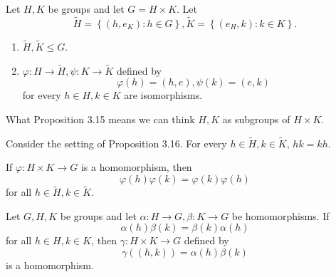 \documentclass[pmath347]{subfiles}
\begin{document}
    \begin{prop}{}
        Let $H,K$ be groups and let $G = H\times K$. Let
        \begin{equation*}
            \tilde{H} = \left\lbrace \left( h,e_K \right) : h\in G \right\rbrace , \tilde{K} = \left\lbrace \left( e_H,k \right) :k\in K \right\rbrace . 
        \end{equation*}
        \begin{enumerate}
            \item $\tilde{H} , \tilde{K} \leq G$.
            \item $\varphi:H\to\tilde{H}, \psi:K\to\tilde{K} $ defined by
                \begin{equation*}
                    \varphi\left( h \right) = \left( h,e \right) , \psi\left( k \right) = \left( e,k \right) 
                \end{equation*}
                for every $h\in H, k\in K$ are isomorphisms.
        \end{enumerate}
    \end{prop}

    \np What Proposition 3.15 means we can think $H,K$ as subgroups of $H\times K$.
    
    \clearpage
    \begin{prop}{}
        Consider the setting of Proposition 3.16. For every $h\in\tilde{H} , k\in\tilde{K}$, $hk=kh$.
    \end{prop}

    \begin{cor}{}
        If $\varphi:H\times K\to G$ is a homomorphism, then
        \begin{equation*}
            \varphi\left( h \right) \varphi\left( k \right) = \varphi\left( k \right) \varphi\left( h \right) 
        \end{equation*}
        for all $h\in\tilde{H} ,k\in\tilde{K}$.
    \end{cor}	
    
    \begin{prop}{}
        Let $G,H,K$ be groups and let $\alpha:H\to G, \beta:K\to G$ be homomorphisms. If
        \begin{equation*}
            \alpha\left( h \right) \beta\left( k \right) = \beta\left( k \right) \alpha\left( h \right) 
        \end{equation*}
        for all $h\in H, k\in K$, then $\gamma:H\times K\to G$ defined by
        \begin{equation*}
            \gamma\left( \left( h,k \right)  \right) = \alpha\left( h \right) \beta\left( k \right) 
        \end{equation*}
        is a homomorphism.
    \end{prop}
\end{document}
